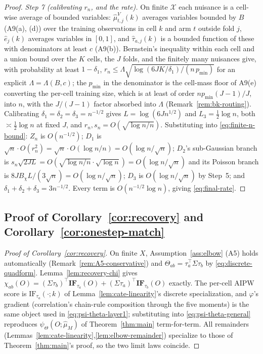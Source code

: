 \documentclass[11pt]{article}
\theoremstyle{plain}
\theoremstyle{definition}
\theoremstyle{remark}
\newcommand{\cX}{\mathcal{X}}
\newcommand{\Qhat}{\widehat{\mu}_M}
\newcommand{\IF}{\mathrm{IF}}
\begin{document}
\begin{proof}
\emph{Step 7 (calibrating $r_n$, and the rate).} On finite $\cX$ each nuisance is a
cell-wise average of bounded variables: $\hat\mu^V_{t,j}(k)$ averages variables bounded by
$B$ (A9(a), (d)) over the training observations in cell $k$ and arm $t$ outside fold $j$,
$\hat e_j(k)$ averages variables in $[0,1]$, and $\hat\tau_{a,j}(k)$ is a bounded function
of these with denominators at least $c$ (A9(b)). Bernstein's inequality within each cell
\citep[Thm.~2.10]{BoucheronLugosiMassart2013} and a union bound over the $K$ cells, the
$J$ folds, and the finitely many nuisances give, with probability at least $1-\delta_1$,
$r_n\le\Lambda\sqrt{\log(6JK/\delta_1)/(n\,p_{\min})}$ for an explicit
$\Lambda=\Lambda(B,c)$; the $p_{\min}$ in the denominator is the cell-mass floor of A9(e)
converting the per-cell training size, which is at least of order $np_{\min}(J-1)/J$, into
$n$, with the $J/(J-1)$ factor absorbed into $\Lambda$
(Remark~\ref{rem:bk-routing}). Calibrating $\delta_1=\delta_2=\delta_3=n^{-1/2}$ gives
$L=\log(6Jn^{1/2})$ and $L_3=\tfrac12\log n$, both $\asymp\tfrac12\log n$ at fixed $J$,
and $r_n,s_n=O(\sqrt{\log n/n})$. Substituting into \eqref{eq:finite-n-bound}: $Z_n$ is
$O(n^{-1/2})$; $D_1$ is $\sqrt n\cdot O(r_n^2)=\sqrt n\cdot O(\log n/n)=O(\log n/\sqrt n)$;
$D_2$'s sub-Gaussian branch is $s_n\sqrt{2JL}=O(\sqrt{\log n/n}\cdot\sqrt{\log n})=O(\log n/\sqrt n)$
and its Poisson branch is $8JB_\chi L/(3\sqrt n)=O(\log n/\sqrt n)$; $D_3$ is
$O(\log n/\sqrt n)$ by Step~5; and $\delta_1+\delta_2+\delta_3=3n^{-1/2}$. Every term is
$O(n^{-1/2}\log n)$, giving \eqref{eq:final-rate}.
\end{proof}

\subsection{Proof of Corollary~\ref{cor:recovery} and Corollary~\ref{cor:onestep-match}}\label{app:proof-recovery}

\begin{proof}[Proof of Corollary~\ref{cor:recovery}]
On finite $X$, Assumption~\ref{ass:elbow} (A5) holds automatically
(Remark~\ref{rem:A5-conservative}) and $\Theta_{ab}=\tau_a^\top\Sigma\tau_b$ by
\eqref{eq:discrete-quadform}. Lemma~\ref{lem:recovery-chi} gives
$\chi_{ab}(O)=(\Sigma\tau_b)^\top\mathbf{IF}_{\tau_a}(O)+(\Sigma\tau_a)^\top\mathbf{IF}_{\tau_b}(O)$
exactly. The per-cell AIPW score is $\IF_{\tau_a}(\cdot;k)$ of Lemma~\ref{lem:cate-linearity}'s
discrete specialization, and $\varphi$'s gradient (correlation's chain-rule
composition through the five moments) is the same object used in
\eqref{eq:psi-theta-layer1}; substituting into \eqref{eq:psi-theta-general}
reproduces $\psi_\Theta(O;\Qhat)$ of Theorem~\ref{thm:main} term-for-term. All
remainders (Lemmas~\ref{lem:cate-linearity},\ref{lem:elbow-remainder}) specialize to
those of Theorem~\ref{thm:main}'s proof, so the two limit laws coincide.
\end{proof}
\end{document}
